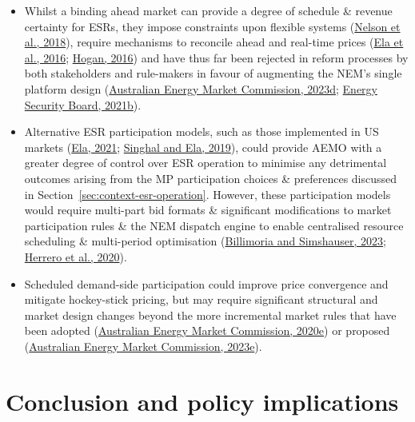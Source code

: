 \documentclass[12pt,a4paper,]{report}
\providecommand{\tightlist}{%
  \setlength{\itemsep}{0pt}\setlength{\parskip}{0pt}}
\begin{document}
\begin{itemize}
\tightlist
\item
  Whilst a binding ahead market can provide a degree of schedule \&
  revenue certainty for ESRs, they impose constraints upon flexible
  systems
  (\protect\hyperlink{ref-nelsonInvestigatingEconomicValue2018}{Nelson
  et al., 2018}), require mechanisms to reconcile ahead and real-time
  prices (\protect\hyperlink{ref-elaWholesaleElectricityMarket2016}{Ela
  et al., 2016};
  \protect\hyperlink{ref-hoganVirtualBiddingElectricity2016a}{Hogan,
  2016}) and have thus far been rejected in reform processes by both
  stakeholders and rule-makers in favour of augmenting the NEM's single
  platform design
  (\protect\hyperlink{ref-australianenergymarketcommissionImprovingSecurityFrameworks2023}{Australian
  Energy Market Commission, 2023d};
  \protect\hyperlink{ref-energysecurityboardPost2025MarketDesign2021}{Energy
  Security Board, 2021b}).
\item
  Alternative ESR participation models, such as those implemented in US
  markets
  (\protect\hyperlink{ref-elaIntegrationElectricStorage2021}{Ela, 2021};
  \protect\hyperlink{ref-singhalIncorporatingElectricStorage2019}{Singhal
  and Ela, 2019}), could provide AEMO with a greater degree of control
  over ESR operation to minimise any detrimental outcomes arising from
  the MP participation choices \& preferences discussed in
  Section~\ref{sec:context-esr-operation}. However, these participation
  models would require multi-part bid formats \& significant
  modifications to market participation rules \& the NEM dispatch engine
  to enable centralised resource scheduling \& multi-period optimisation
  (\protect\hyperlink{ref-billimoriaContractDesignStorage2023a}{Billimoria
  and Simshauser, 2023};
  \protect\hyperlink{ref-herreroEvolvingBiddingFormats2020}{Herrero et
  al., 2020}).
\item
  Scheduled demand-side participation could improve price convergence
  and mitigate hockey-stick pricing, but may require significant
  structural and market design changes beyond the more incremental
  market rules that have been adopted
  (\protect\hyperlink{ref-australianenergymarketcommissionWholesaleDemandResponse2020}{Australian
  Energy Market Commission, 2020e}) or proposed
  (\protect\hyperlink{ref-australianenergymarketcommissionIntegratingPriceresponsiveResources2023}{Australian
  Energy Market Commission, 2023e}).
\end{itemize}

\hypertarget{sec:info-conclusion}{%
\section{Conclusion and policy implications}\label{sec:info-conclusion}}
\end{document}

